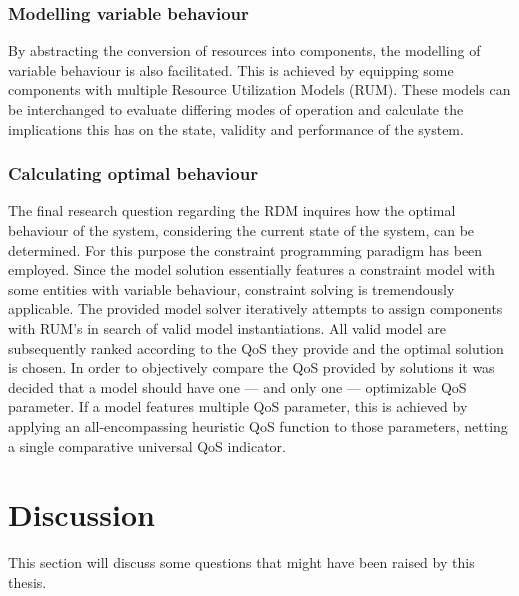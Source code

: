 \subsubsection{Modelling variable behaviour}
By abstracting the conversion of resources into components, the modelling of variable behaviour is also facilitated. This is achieved by equipping some components with multiple Resource Utilization Models (RUM). These models can be interchanged to evaluate differing modes of operation and calculate the implications this has on the state, validity and performance of the system.

\subsubsection{Calculating optimal behaviour}
The final research question regarding the RDM inquires how the optimal behaviour of the system, considering the current state of the system, can be determined. For this purpose the constraint programming paradigm has been employed. Since the model solution essentially features a constraint model with some entities with variable behaviour, constraint solving is tremendously applicable. The provided model solver iteratively attempts to assign components with RUM's in search of valid model instantiations. All valid model are subsequently ranked according to the QoS they provide and the optimal solution is chosen. In order to objectively compare the QoS provided by solutions it was decided that a model should have one --- and only one --- optimizable QoS parameter. If a model features multiple QoS parameter, this is achieved by applying an all-encompassing heuristic QoS function to those parameters, netting a single comparative universal QoS indicator.

\section{Discussion}
\label{sec:conclusion:discussion}
This section will discuss some questions that might have been raised by this thesis.
